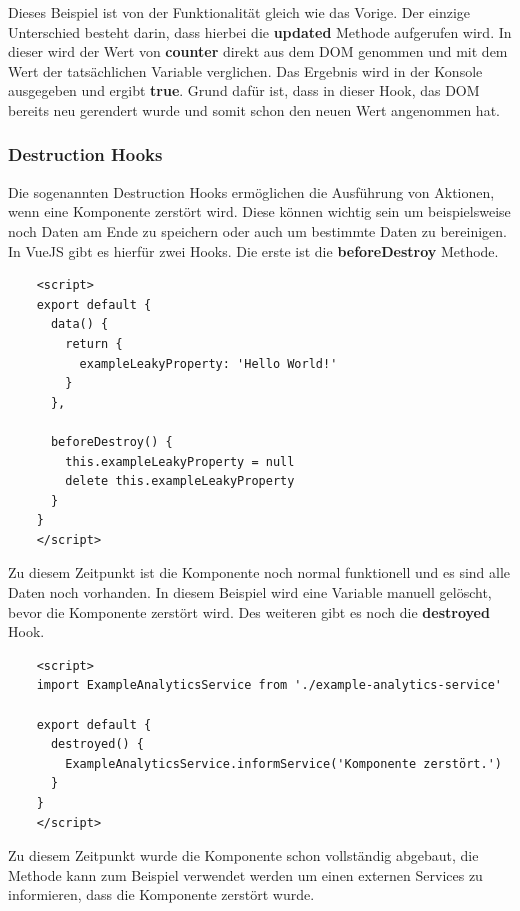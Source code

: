 Dieses Beispiel ist von der Funktionalität gleich wie das Vorige. Der einzige Unterschied besteht darin, dass hierbei die \textbf{updated} Methode aufgerufen wird. In dieser wird der Wert von \textbf{counter} direkt aus dem DOM genommen und mit dem Wert der tatsächlichen Variable verglichen. Das Ergebnis wird in der Konsole ausgegeben und ergibt \textbf{true}. Grund dafür ist, dass in dieser Hook, das DOM bereits neu gerendert wurde und somit schon den neuen Wert angenommen hat.

\subsubsection{Destruction Hooks}
Die sogenannten Destruction Hooks ermöglichen die Ausführung von Aktionen, wenn eine Komponente zerstört wird. Diese können wichtig sein um beispielsweise noch Daten am Ende zu speichern oder auch um bestimmte Daten zu bereinigen.
In VueJS gibt es hierfür zwei Hooks. Die erste ist die \textbf{beforeDestroy} Methode.

\begin{lstlisting}
    <script>
    export default {
      data() {
        return {
          exampleLeakyProperty: 'Hello World!'
        }
      },
    
      beforeDestroy() {
        this.exampleLeakyProperty = null
        delete this.exampleLeakyProperty
      }
    }
    </script>
\end{lstlisting}

Zu diesem Zeitpunkt ist die Komponente noch normal funktionell und es sind alle Daten noch vorhanden. In diesem Beispiel wird eine Variable manuell gelöscht, bevor die Komponente zerstört wird.
\newpage
Des weiteren gibt es noch die \textbf{destroyed} Hook.

\begin{lstlisting}
    <script>
    import ExampleAnalyticsService from './example-analytics-service'
    
    export default {
      destroyed() {
        ExampleAnalyticsService.informService('Komponente zerstört.')
      }
    }
    </script>
\end{lstlisting}

Zu diesem Zeitpunkt wurde die Komponente schon vollständig abgebaut,  die Methode kann zum Beispiel verwendet werden um einen externen Services zu informieren, dass die Komponente zerstört wurde.

\cite{frontend_web_vuejs_lifecycle}
